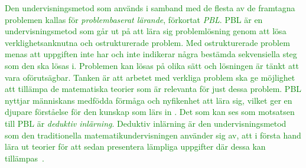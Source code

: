 \textcolor{green}{Den undervisningsmetod som används i samband med de flesta av de framtagna problemen kallas för \textit{problembaserat lärande}, förkortat \textit{PBL}. PBL är en undervisningsmetod som går ut på att lära sig problemlösning genom att lösa verklighetsanknutna och ostrukturerade problem. Med ostrukturerade problem menas att uppgiften inte har och inte indikerar några bestämda sekvensiella steg som den ska lösas i. Problemen kan lösas på olika sätt och lösningen är tänkt att vara oförutsägbar. Tanken är att arbetet med verkliga problem ska ge möjlighet att tillämpa de matematiska teorier som är relevanta för just dessa problem. PBL nyttjar människans medfödda förmåga och nyfikenhet att lära sig, vilket ger en djupare förståelse för den kunskap som lärs in \cite{PBLdefinition} \cite{djupareKunskapPBL}. Det som kan ses som motsatsen till PBL är \textit{deduktiv inlärning}. Deduktiv inlärning är den undervisningsmetod som den traditionella matematikundervisningen använder sig av, att i första hand lära ut teorier för att sedan presentera lämpliga uppgifter där dessa kan tillämpas~\cite{deduktivInlärning}.}

%
%
%
%
%

